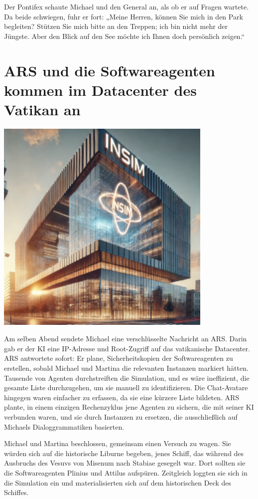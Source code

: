 \documentclass[
]{article}
\begin{document}
Der Pontifex schaute Michael und den General an, als ob er auf Fragen
wartete. Da beide schwiegen, fuhr er fort: „Meine Herren, können Sie
mich in den Park begleiten? Stützen Sie mich bitte an den Treppen; ich
bin nicht mehr der Jüngste. Aber den Blick auf den See möchte ich Ihnen
doch persönlich zeigen.``

\section{ARS und die Softwareagenten kommen im Datacenter des Vatikan
an}\label{ars-und-die-softwareagenten-kommen-im-datacenter-des-vatikan-an}

\includegraphics[width=4.10573in,height=4.0909in]{media/image10.png}

Am selben Abend sendete Michael eine verschlüsselte Nachricht an ARS.
Darin gab er der KI eine IP-Adresse und Root-Zugriff auf das
vatikanische Datacenter. ARS antwortete sofort: Er plane,
Sicherheitskopien der Softwareagenten zu erstellen, sobald Michael und
Martina die relevanten Instanzen markiert hätten. Tausende von Agenten
durchstreiften die Simulation, und es wäre ineffizient, die gesamte
Liste durchzugehen, um sie manuell zu identifizieren. Die Chat-Avatare
hingegen waren einfacher zu erfassen, da sie eine kürzere Liste
bildeten. ARS plante, in einem einzigen Rechenzyklus jene Agenten zu
sichern, die mit seiner KI verbunden waren, und sie durch Instanzen zu
ersetzen, die ausschließlich auf Michaels Dialoggrammatiken basierten.

Michael und Martina beschlossen, gemeinsam einen Versuch zu wagen. Sie
würden sich auf die historische Liburne begeben, jenes Schiff, das
während des Ausbruchs des Vesuvs von Misenum nach Stabiae gesegelt war.
Dort sollten sie die Softwareagenten Plinius und Attilus aufspüren.
Zeitgleich loggten sie sich in die Simulation ein und materialisierten
sich auf dem historischen Deck des Schiffes.
\end{document}
